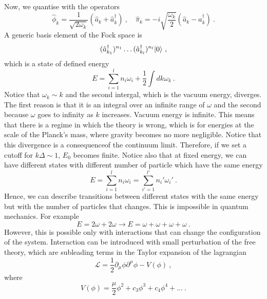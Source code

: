     Now, we quantise with the operators 
    \begin{equation*}
        \hat \phi_k = \frac{1}{\sqrt{2 \omega_k}} (\hat a_k + \hat a^\dagger_k) ~, \quad \hat \pi_k = - i \sqrt{\frac{\omega_k}{2}} (\hat a_k - \hat a^\dagger_k)  ~.
    \end{equation*}
    A generic basis element of the Fock space is 
    \begin{equation*}
        (\hat a_{k_1}^\dagger)^{n_1} \ldots (\hat a_{k_l}^\dagger)^{n_l} \vert0\rangle ~,
    \end{equation*}
    which is a state of defined energy 
    \begin{equation*}
        E = \sum_{i=1}^{l} n_i \omega_i + \frac{1}{2} \int dk \omega_k ~.
    \end{equation*}
    Notice that $\omega_k \sim k$ and the second intergal, which is the vacuum energy, diverges. The first reason is that it is an integral over an infinite range of $\omega$ and the second because $\omega$ goes to infinity as $k$ increases. Vacuum energy is infinite. This means that there is a regime in which the theory is wrong, which is for energies at the scale of the Planck's mass, where gravity becomes no more negligible. Notice that this divergence is a consequenceof the continuum limit. Therefore, if we set a cutoff for $k \Delta \sim 1$, $E_0$ becomes finite. Notice also that at fixed energy, we can have different states with different number of particle which have the same energy 
    \begin{equation*}
        E = \sum_{i = 1}^{l} n_i \omega_i = \sum_{i' = 1}^{l'} n_i' \omega_i' ~.
    \end{equation*}
    Hence, we can describe transitions between different states with the same energy but with the number of particles that changes. This is impossible in quantum mechanics. For example 
    \begin{equation*}
        E = 2 \omega + 2 \omega \rightarrow E = \omega + \omega + \omega + \omega ~.
    \end{equation*}
    However, this is possible only with interactions that can change the configuration of the system. Interaction can be introduced with small perturbation of the free theory, which are subleading terms in the Taylor expansion of the lagrangian
    \begin{equation*}
        \mathcal L = \frac{1}{2} \partial_\mu \phi \partial^\mu \phi - V(\phi) ~,
    \end{equation*}
    where 
    \begin{equation*}
        V(\phi) = \frac{\mu}{2} \phi^2 + c_3 \phi^3 + c_4 \phi^4 + \ldots ~.
    \end{equation*}
